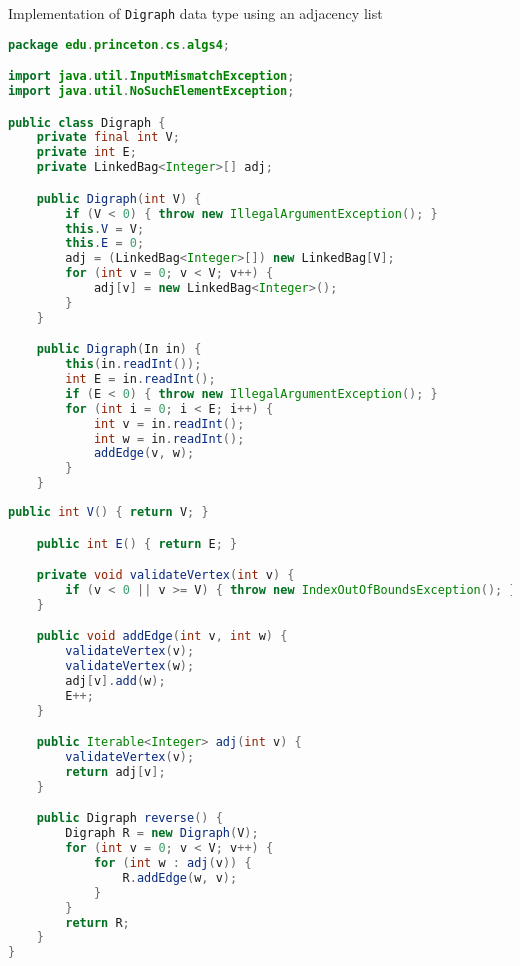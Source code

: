 \documentclass[8pt,a4paper,compress]{beamer}
\begin{document}
\begin{frame}[fragile]
\pause

Implementation of \lstinline{Digraph} data type using an adjacency list
\begin{lstlisting}[language=Java]
package edu.princeton.cs.algs4;

import java.util.InputMismatchException;
import java.util.NoSuchElementException;

public class Digraph {
    private final int V;
    private int E;
    private LinkedBag<Integer>[] adj;

    public Digraph(int V) {
        if (V < 0) { throw new IllegalArgumentException(); }
        this.V = V;
        this.E = 0;
        adj = (LinkedBag<Integer>[]) new LinkedBag[V];
        for (int v = 0; v < V; v++) { 
            adj[v] = new LinkedBag<Integer>(); 
        }
    }

    public Digraph(In in) {
        this(in.readInt());
        int E = in.readInt();
        if (E < 0) { throw new IllegalArgumentException(); }
        for (int i = 0; i < E; i++) {
            int v = in.readInt();
            int w = in.readInt();
            addEdge(v, w); 
        }
    }
\end{lstlisting}
\end{frame}

\begin{frame}[fragile]
\pause

\begin{lstlisting}[language=Java]
    public int V() { return V; }

    public int E() { return E; }

    private void validateVertex(int v) {
        if (v < 0 || v >= V) { throw new IndexOutOfBoundsException(); }
    }

    public void addEdge(int v, int w) {
        validateVertex(v);
        validateVertex(w);
        adj[v].add(w);
        E++;
    }

    public Iterable<Integer> adj(int v) {
        validateVertex(v);
        return adj[v];
    }

    public Digraph reverse() {
        Digraph R = new Digraph(V);
        for (int v = 0; v < V; v++) {
            for (int w : adj(v)) {
                R.addEdge(w, v);
            }
        }
        return R;
    }
}
\end{lstlisting}
\end{frame}
\end{document}
